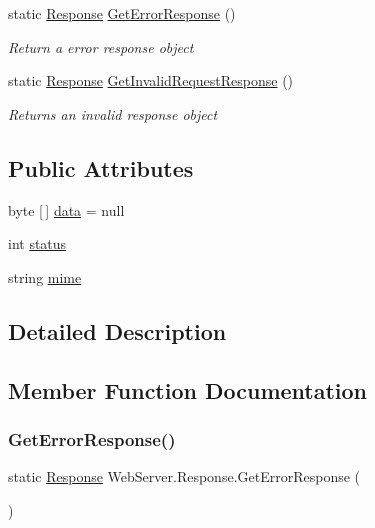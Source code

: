 \begin{DoxyCompactItemize}
static \hyperlink{class_web_server_1_1_response}{Response} \hyperlink{class_web_server_1_1_response_a38454522b325b77fe0ac6ddab897c28a}{Get\+Error\+Response} ()
\begin{DoxyCompactList}\small\item\em Return a error response object \end{DoxyCompactList}\item 
static \hyperlink{class_web_server_1_1_response}{Response} \hyperlink{class_web_server_1_1_response_a4c07fb11cc4ca0f8b2c83dbcc7054c69}{Get\+Invalid\+Request\+Response} ()
\begin{DoxyCompactList}\small\item\em Returns an invalid response object \end{DoxyCompactList}\end{DoxyCompactItemize}
\subsection*{Public Attributes}
\begin{DoxyCompactItemize}
\item 
byte \mbox{[}$\,$\mbox{]} \hyperlink{class_web_server_1_1_response_aa1776556ba9d3b143497693375106ea1}{data} = null
\item 
int \hyperlink{class_web_server_1_1_response_a132606b61e9c9d01b80114418920c0f7}{status}
\item 
string \hyperlink{class_web_server_1_1_response_a12b80a663fee3e25d797abd8bbcbaaef}{mime}
\end{DoxyCompactItemize}


\subsection{Detailed Description}




\subsection{Member Function Documentation}
\mbox{\label{class_web_server_1_1_response_a38454522b325b77fe0ac6ddab897c28a}} 
\subsubsection{\texorpdfstring{Get\+Error\+Response()}{GetErrorResponse()}}
{\footnotesize\ttfamily static \hyperlink{class_web_server_1_1_response}{Response} Web\+Server.\+Response.\+Get\+Error\+Response (\begin{DoxyParamCaption}{ }\end{DoxyParamCaption})\hspace{0.3cm}{\ttfamily [static]}}



